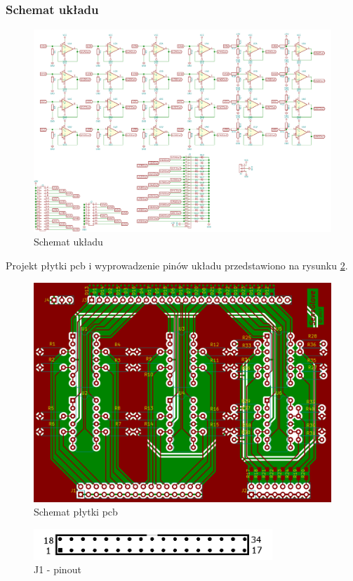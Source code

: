 \documentclass{article}
\begin{document}
\subsubsection{Schemat układu}

\begin{figure}[H]
	\centering
	\includegraphics[width=15cm]{schemat.png}
	\caption{Schemat układu}
	\label{rys:schemat_ukladu}
\end{figure}

Projekt płytki pcb i wyprowadzenie pinów układu przedstawiono na rysunku  \ref{rys:pcb}.

\begin{figure}[H]
	\centering
	\includegraphics[width=12cm]{pcb.png}
	\caption{Schemat płytki pcb}
	\label{rys:pcb}
\end{figure}

\begin{figure}[H]
	\centering
	\includegraphics[width=9cm]{J1.png}
	\caption{J1 - pinout}
	\label{rys:J1 - pinout}
\end{figure}
\end{document}
